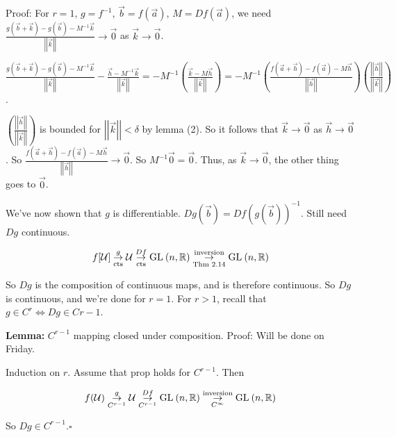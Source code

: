 \documentclass[10pt,letterpaper]{article}
\newcommand{\n}{\hfill\break}
\newcommand{\lemma}[1]{\par\noindent\settowidth{\hangindent}{\textbf{Lemma: }}\textbf{Lemma: }#1\n}
\newcommand{\proven}{\;$\square$\n}
\newcommand{\ptxt}[1]{\textrm{\textnormal{#1}}}
\newcommand{\reals}{\mathbb{R}}
\newcommand{\R}{\reals}
\newcommand{\inv}{^{-1}}
\newcommand{\abs}[1]{\left|#1\right|}
\newcommand{\norm}[1]{\abs{\abs{#1}}}
\newcommand{\GL}{\ptxt{GL}\>}
\newcommand{\uball}{\mathcal{U}}
\begin{document}
\par\noindent Proof: For $r=1$, $g=f\inv$, $\vec{b}=f(\vec{a})$, $M=Df(\vec{a})$, we need $\displaystyle\frac{g(\vec{b}+\vec{k})-g(\vec{b})-M\inv\vec{k}}{\norm{\vec{k}}}\to\vec{0}$ as $\vec{k}\to\vec{0}$.\n

\par\noindent $\displaystyle\frac{g(\vec{b}+\vec{k})-g(\vec{b})-M\inv\vec{k}}{\norm{\vec{k}}}-\frac{\vec{h}-M\inv\vec{k}}{\norm{\vec{k}}}=-M\inv\left(\frac{\vec{k}-M\vec{h}}{\norm{\vec{k}}}\right)=-M\inv\left(\frac{f(\vec{a}+\vec{h})-f(\vec{a})-M\vec{h}}{\norm{\vec{h}}}\right)\left(\frac{\norm{\vec{h}}}{\norm{\vec{k}}}\right)$.\n

\par\noindent $\left(\frac{\norm{\vec{h}}}{\norm{\vec{k}}}\right)$ is bounded for $\norm{\vec{k}}<\delta$ by lemma (2). So it follows that $\vec{k}\to\vec{0}$ as $\vec{h}\to\vec{0}$. So $\frac{f(\vec{a}+\vec{h})-f(\vec{a})-M\vec{h}}{\norm{\vec{h}}}\to\vec{0}$. So $M\inv\vec{0}=\vec{0}$. Thus, as $\vec{k}\to\vec{0}$, the other thing goes to $\vec{0}$.\n

\par\noindent We've now shown that $g$ is differentiable. $Dg(\vec{b})=Df(g(\vec{b}))\inv$. Still need $Dg$ continuous.\n

\[
f[\uball]\overset{g}{\underset{\ptxt{cts}}{\to}}\uball\overset{Df}{\underset{\ptxt{cts}}{\to}}\GL(n,\R)\overset{\ptxt{inversion}}{\underset{\ptxt{Thm 2.14}}{\to}}\GL(n,\R)
\]

\par\noindent So $Dg$ is the composition of continuous maps, and is therefore continuous. So $Dg$ is continuous, and we're done for $r=1$. For $r>1$, recall that $g\in{}C^{r}\Leftrightarrow{}Dg\in{}C{r-1}$.\n

\lemma{$C^{r-1}$ mapping closed under composition.\n
Proof: Will be done on Friday.}

\par\noindent Induction on $r$. Assume that prop holds for $C^{r-1}$. Then

\[
f(\uball)\overset{g}{\underset{C^{r-1}}{\to}}\uball\overset{Df}{\underset{C^{r-1}}{\to}}\GL(n,\R)\overset{\ptxt{inversion}}{\underset{C^{\infty}}{\to}}\GL(n,\R)
\]

\par\noindent So $Dg\in{}C^{r-1}$.\proven
\end{document}

